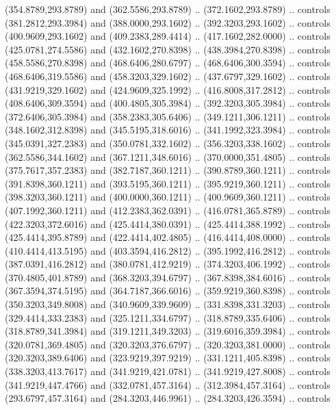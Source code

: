 {{\begin{scope}[y=-0.80pt,x=0.80pt,scale=0.038,xshift=-135pt,yshift=355pt]
        (354.8789,293.8789) and (362.5586,293.8789) .. (372.1602,293.8789) .. controls
        (381.2812,293.3984) and (388.0000,293.1602) .. (392.3203,293.1602) .. controls
        (400.9609,293.1602) and (409.2383,289.4414) .. (417.1602,282.0000) .. controls
        (425.0781,274.5586) and (432.1602,270.8398) .. (438.3984,270.8398) .. controls
        (458.5586,270.8398) and (468.6406,280.6797) .. (468.6406,300.3594) .. controls
        (468.6406,319.5586) and (458.3203,329.1602) .. (437.6797,329.1602) .. controls
        (431.9219,329.1602) and (424.9609,325.1992) .. (416.8008,317.2812) .. controls
        (408.6406,309.3594) and (400.4805,305.3984) .. (392.3203,305.3984) .. controls
        (372.6406,305.3984) and (358.2383,305.6406) .. (349.1211,306.1211) .. controls
        (348.1602,312.8398) and (345.5195,318.6016) .. (341.1992,323.3984) .. controls
        (345.0391,327.2383) and (350.0781,332.1602) .. (356.3203,338.1602) .. controls
        (362.5586,344.1602) and (367.1211,348.6016) .. (370.0000,351.4805) .. controls
        (375.7617,357.2383) and (382.7187,360.1211) .. (390.8789,360.1211) .. controls
        (391.8398,360.1211) and (393.5195,360.1211) .. (395.9219,360.1211) .. controls
        (398.3203,360.1211) and (400.0000,360.1211) .. (400.9609,360.1211) .. controls
        (407.1992,360.1211) and (412.2383,362.0391) .. (416.0781,365.8789) .. controls
        (422.3203,372.6016) and (425.4414,380.0391) .. (425.4414,388.1992) .. controls
        (425.4414,395.8789) and (422.4414,402.4805) .. (416.4414,408.0000) .. controls
        (410.4414,413.5195) and (403.3594,416.2812) .. (395.1992,416.2812) .. controls
        (387.0391,416.2812) and (380.0781,412.9219) .. (374.3203,406.1992) .. controls
        (370.4805,401.8789) and (368.3203,394.6797) .. (367.8398,384.6016) .. controls
        (367.3594,374.5195) and (364.7187,366.6016) .. (359.9219,360.8398) .. controls
        (350.3203,349.8008) and (340.9609,339.9609) .. (331.8398,331.3203) .. controls
        (329.4414,333.2383) and (325.1211,334.6797) .. (318.8789,335.6406) .. controls
        (318.8789,341.3984) and (319.1211,349.3203) .. (319.6016,359.3984) .. controls
        (320.0781,369.4805) and (320.3203,376.6797) .. (320.3203,381.0000) .. controls
        (320.3203,389.6406) and (323.9219,397.9219) .. (331.1211,405.8398) .. controls
        (338.3203,413.7617) and (341.9219,421.0781) .. (341.9219,427.8008) .. controls
        (341.9219,447.4766) and (332.0781,457.3164) .. (312.3984,457.3164) .. controls
        (293.6797,457.3164) and (284.3203,446.9961) .. (284.3203,426.3594) .. controls

\end{scope}}}
